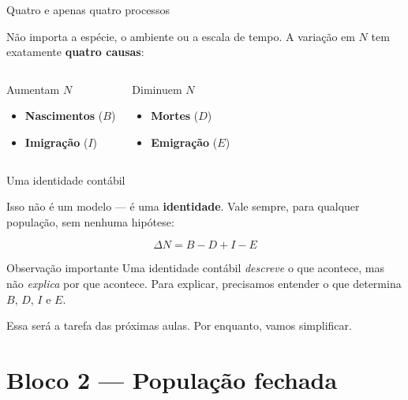 \documentclass[12pt]{beamer}
\begin{document}
\begin{frame}{Quatro e apenas quatro processos}

  Não importa a espécie, o ambiente ou a escala de tempo.
  A variação em $N$ tem exatamente \textbf{quatro causas}:

  \bigskip
  \begin{columns}[t]
      \begin{exampleblock}{Aumentam $N$}
        \begin{itemize}
          \item \textbf{Nascimentos} ($B$)
          \item \textbf{Imigração} ($I$)
        \end{itemize}
      \end{exampleblock}
      \begin{alertblock}{Diminuem $N$}
        \begin{itemize}
          \item \textbf{Mortes} ($D$)
          \item \textbf{Emigração} ($E$)
        \end{itemize}
      \end{alertblock}
  \end{columns}

\end{frame}

\begin{frame}{Uma identidade contábil}

  Isso não é um modelo --- é uma \textbf{identidade}.
  Vale sempre, para qualquer população, sem nenhuma hipótese:

  \[
    \Delta N = B - D + I - E
  \]

  \bigskip
  \begin{block}{Observação importante}
    Uma identidade contábil \emph{descreve} o que acontece,
    mas não \emph{explica} por que acontece.
    Para explicar, precisamos entender o que determina
    $B$, $D$, $I$ e $E$.
  \end{block}

  \bigskip
  Essa será a tarefa das próximas aulas.
  Por enquanto, vamos simplificar.

\end{frame}

\section{Bloco 2 — População fechada}
\end{document}
